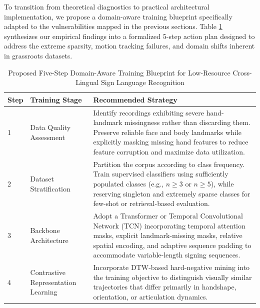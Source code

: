 \documentclass{ieeeaccess}
\begin{document}
To transition from theoretical diagnostics to practical architectural implementation, we propose a domain-aware training blueprint specifically adapted to the vulnerabilities mapped in the previous sections. Table \ref{tab:action_plan} synthesizes our empirical findings into a formalized 5-step action plan designed to address the extreme sparsity, motion tracking failures, and domain shifts inherent in grassroots datasets.

\begin{table}[!t]
\caption{Proposed Five-Step Domain-Aware Training Blueprint for Low-Resource Cross-Lingual Sign Language Recognition}
\label{tab:action_plan}

\centering
\small
\setlength{\tabcolsep}{5pt}

\begin{tabular}{p{0.7cm}p{3.2cm}p{11.8cm}}

\toprule

\textbf{Step} &
\textbf{Training Stage} &
\textbf{Recommended Strategy} \\

\midrule

1 &
Data Quality Assessment &
Identify recordings exhibiting severe hand-landmark missingness rather than discarding them. Preserve reliable face and body landmarks while explicitly masking missing hand features to reduce feature corruption and maximize data utilization. \\

\addlinespace

2 &
Dataset Stratification &
Partition the corpus according to class frequency. Train supervised classifiers using sufficiently populated classes (e.g., $n\ge3$ or $n\ge5$), while reserving singleton and extremely sparse classes for few-shot or retrieval-based evaluation. \\

\addlinespace

3 &
Backbone Architecture &
Adopt a Transformer or Temporal Convolutional Network (TCN) incorporating temporal attention masks, explicit landmark-missing masks, relative spatial encoding, and adaptive sequence padding to accommodate variable-length signing sequences. \\

\addlinespace

4 &
Contrastive Representation Learning &
Incorporate DTW-based hard-negative mining into the training objective to distinguish visually similar trajectories that differ primarily in handshape, orientation, or articulation dynamics. \\


\end{tabular}
\end{table}
\end{document}
